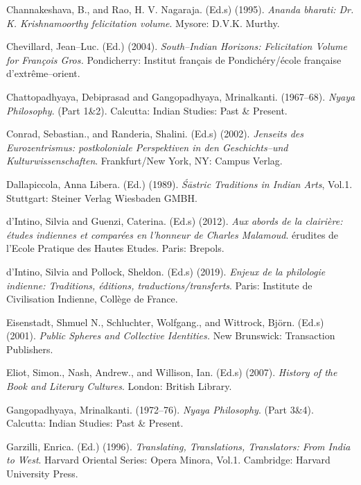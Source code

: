\begin{thebibliography}{99}
 \item Channakeshava, B., and Rao, H. V. Nagaraja. (Ed.s) (1995). \textit{Ananda bharati: Dr. K. Krishnamoorthy felicitation volume}. Mysore: D.V.K. Murthy.

 \item Chevillard, Jean–Luc. (Ed.) (2004). \textit{South–Indian Horizons: Felicitation Volume for François Gros.} Pondicherry: Institut français de Pondichéry/école française d'extrême–orient.

 \item Chattopadhyaya, Debiprasad and Gangopadhyaya, Mrinalkanti. (1967–68). \textit{Nyaya Philosophy}. (Part 1\&2). Calcutta: Indian Studies: Past \& Present.

 \item Conrad, Sebastian., and Randeria, Shalini. (Ed.s) (2002). \textit{Jenseits des Eurozentrismus: postkoloniale Perspektiven in den Geschichts–und Kulturwissenschaften}. Frankfurt/New York, NY: Campus Verlag.

 \item Dallapiccola, Anna Libera. (Ed.) (1989). \textit{Śāstric Traditions in Indian Arts}, Vol.1. Stuttgart: Steiner Verlag Wiesbaden GMBH.

 \item d’Intino, Silvia and Guenzi, Caterina. (Ed.s) (2012).\textit{ Aux abords de la clairière: études indiennes et comparées en l’honneur de Charles Malamoud}. érudites de l’Ecole Pratique des Hautes Etudes. Paris: Brepols.

 \item d’Intino, Silvia and Pollock, Sheldon. (Ed.s) (2019). \textit{Enjeux de la philologie indienne: Traditions, éditions, traductions/transferts}. Paris: Institute de Civilisation Indienne, Collège de France.

 \item Eisenstadt, Shmuel N., Schluchter, Wolfgang., and Wittrock, Björn. (Ed.s) (2001). \textit{Public Spheres and Collective Identities. }New Brunswick: Transaction Publishers.

 \item Eliot, Simon., Nash, Andrew., and Willison, Ian. (Ed.s) (2007). \textit{History of the Book and Literary Cultures}. London: British Library.

 \item Gangopadhyaya, Mrinalkanti. (1972–76). \textit{Nyaya Philosophy}. (Part 3\&4). Calcutta: Indian Studies: Past \& Present.

 \item Garzilli, Enrica. (Ed.) (1996).\textit{ Translating, Translations, Translators: From India to West}. Harvard Oriental Series: Opera Minora, Vol.1. Cambridge: Harvard University Press.


\end{thebibliography}
